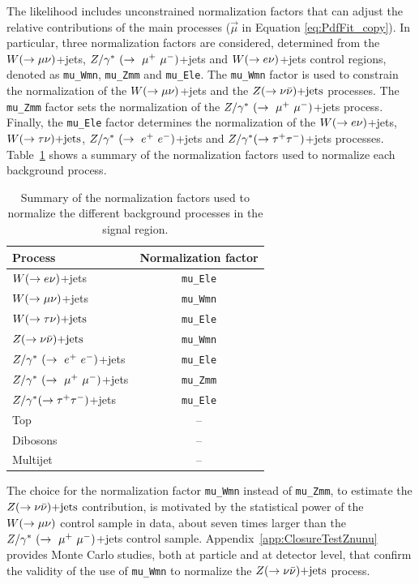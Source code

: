The likelihood includes unconstrained normalization factors that can adjust the relative contributions of the main processes ($\vec{\mu}$ in Equation \ref{eq:PdfFit_copy}).
In particular, three normalization factors are considered, determined from the $W(\rightarrow \mu \nu)$+jets, $Z/\gamma^*~(\rightarrow~\mu^+~\mu^-)$+jets and $W(\rightarrow e \nu)$+jets control regions, denoted as \texttt{mu\_Wmn}, \texttt{mu\_Zmm} and \texttt{mu\_Ele}.
The \texttt{mu\_Wmn} factor is used to constrain the normalization of the $W(\rightarrow \mu \nu)$+jets and the $Z(\rightarrow \nu \bar{\nu})\text{+jets}$ processes.
The \texttt{mu\_Zmm} factor sets the normalization of the $Z/\gamma^*~(\rightarrow~\mu^+~\mu^-)$+jets process.
Finally, the \texttt{mu\_Ele} factor determines the normalization of the $W(\rightarrow e \nu)$+jets, $W(\rightarrow \tau \nu)\text{+jets}$, $Z/\gamma^*~(\rightarrow~e^+~e^-)$+jets and $Z/\gamma^*(\rightarrow \tau^+ \tau^-)$+jets processes.
Table~\ref{tab:scaleFactorsSummary} shows a summary of the normalization factors used to normalize each background process.

\begin{table}[!ht]
  \begin{center}
    \begin{small}
      \begin{tabular}{lc}
      \hline\hline
        {\bf Process} & {\bf Normalization factor} \\
        \hline
        $W(\rightarrow e \nu)$+jets   & \texttt{mu\_Ele} \\ 
        $W(\rightarrow \mu \nu)$+jets   & \texttt{mu\_Wmn} \\ 
        $W(\rightarrow \tau \nu)\text{+jets}$   & \texttt{mu\_Ele} \\ 
        $Z(\rightarrow \nu \bar{\nu})\text{+jets}$   & \texttt{mu\_Wmn} \\ 
        $Z/\gamma^*~(\rightarrow~e^+~e^-)$+jets   & \texttt{mu\_Ele} \\ 
        $Z/\gamma^*~(\rightarrow~\mu^+~\mu^-)$+jets   & \texttt{mu\_Zmm} \\ 
        $Z/\gamma^*(\rightarrow \tau^+ \tau^-)$+jets   & \texttt{mu\_Ele} \\ 
        Top      & -- \\ 
        Dibosons & -- \\ 
        Multijet & -- \\ 
       \hline\hline
      \end{tabular}
    \end{small}
  \end{center}
  \caption{Summary of the normalization factors used to normalize the different background processes in the signal region.}
  \label{tab:scaleFactorsSummary}
\end{table}

The choice for the normalization factor \texttt{mu\_Wmn} instead of \texttt{mu\_Zmm}, to estimate the $Z(\rightarrow \nu \bar{\nu})\text{+jets}$ contribution, is motivated by the statistical power of the $W(\rightarrow \mu \nu)$ control sample in data, about seven times larger than the $Z/\gamma^*~(\rightarrow~\mu^+~\mu^-)$+jets control sample.
Appendix~\ref{app:ClosureTestZnunu} provides Monte Carlo studies, both at particle and at detector level, that confirm the validity of the use of \texttt{mu\_Wmn} to normalize the $Z(\rightarrow \nu \bar{\nu})\text{+jets}$ process.


